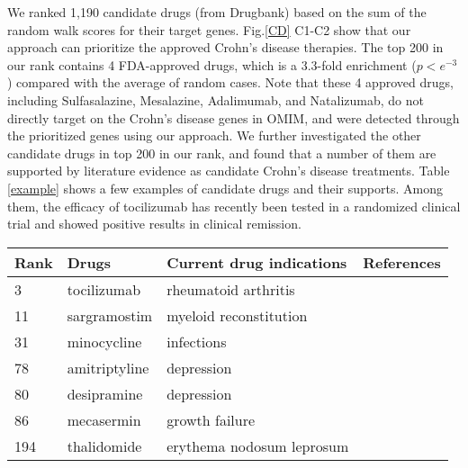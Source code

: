 We ranked 1,190 candidate drugs (from Drugbank) based on the sum of the random
walk scores for their target genes. Fig.\ref{CD} C1-C2 show
that our approach can prioritize the approved Crohn's disease therapies.
The top 200 in our rank contains
4 FDA-approved drugs, which is a 3.3-fold enrichment ($p<e^{-3}$)
compared with the average of random cases.
Note that these 4 approved drugs, including Sulfasalazine, Mesalazine,
Adalimumab, and Natalizumab, do not directly target on the
Crohn's disease genes in OMIM, and were detected through the
prioritized genes using our approach.
We further investigated the other candidate drugs in top 200 in our rank,
and found that a number of them are supported by literature evidence
as candidate Crohn's disease treatments.
Table \ref{example}
shows a few examples of candidate drugs and their supports.
Among them, the efficacy of tocilizumab
has recently been tested in a randomized clinical trial \cite{lazzerini2013effect}
and showed positive results in clinical remission.
\begin{table*}[!t]
\caption{Drug candidates for Crohn’s disease that are supported by literature.}
\label{example}
\centering
\begin{tabular}{llll}
\hline
Rank&Drugs & Current drug indications & References\\\hline
3&tocilizumab & rheumatoid arthritis	 & \cite{nishimoto2008humanized,gergis2010effectiveness}\\\hline
11&sargramostim&	myeloid reconstitution&\cite{korzenik2005sargramostim,roth2011sargramostim}\\\hline
31&minocycline&infections &\cite{margolis2010potential}\\\hline
78&amitriptyline& depression & \cite{rahimi2012antidepressants}\\\hline
80&desipramine&depression&\cite{rahimi2009efficacy}\\\hline
86&mecasermin&growth failure&\cite{rosenbloom2009mecasermin,puche2012human}\\\hline
194&thalidomide & erythema nodosum leprosum & \cite{lazzerini2013effect}\\\hline
\end{tabular}
\end{table*}



